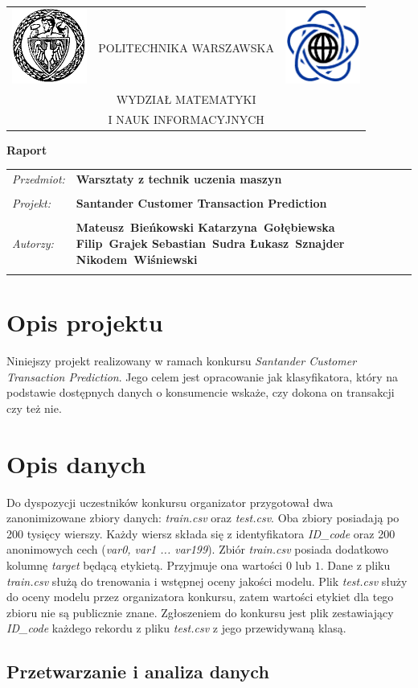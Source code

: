 \documentclass[12pt]{article}
\renewcommand{\maketitle}{
\begin{titlepage}
\begin{table}[t]
\centering
\begin{tabular}[t]{lcr}
 \includegraphics[width=70pt,height=70pt]{PW} & POLITECHNIKA WARSZAWSKA & \includegraphics[width=70pt,height=70pt]{MiNI}\\
& WYDZIAŁ MATEMATYKI & \\
& I NAUK INFORMACYJNYCH &
\end{tabular}
\end{table}
\vspace*{3cm}
  \begin{center}
    \LARGE
    \textbf {Raport}\\
   \vspace*{2 cm}
\begin{table}[!htp]
\begin{tabular}{p{4cm}p{10cm}}
\textit{Przedmiot:} &\textbf {Warsztaty z technik uczenia maszyn} \\
\\
\textit{Projekt:} &\textbf {Santander Customer Transaction Prediction} \\
\\
\textit{Autorzy:} &\textbf {Mateusz~Bieńkowski \newline
	Katarzyna~Gołębiewska \newline
	Filip~Grajek \newline
	Sebastian~Sudra \newline
	Łukasz~Sznajder \newline
	Nikodem~Wiśniewski \newline 
 } \\
\\
\end{tabular}
\end{table}

\vspace{4 cm}
  \center{\small Warszawa, dnia \today}
\end{center}
\end{titlepage}
}
\begin{document}
\maketitle

\newpage

\section{Opis projektu}

Niniejszy projekt realizowany w ramach konkursu \textit{Santander Customer Transaction Prediction}\cite{santanderkaggle}. Jego celem jest opracowanie jak klasyfikatora, który na podstawie dostępnych danych o konsumencie wskaże, czy dokona on transakcji czy też nie. 

\section{Opis danych}

Do dyspozycji uczestników konkursu organizator przygotował dwa zanonimizowane zbiory danych: \textit{train.csv} oraz \textit{test.csv}. Oba zbiory posiadają po 200 tysięcy wierszy. Każdy wiersz składa się z identyfikatora \textit{ID\_code} oraz 200 anonimowych cech (\textit{var0, var1 ... var199}). Zbiór \textit{train.csv} posiada dodatkowo kolumnę \textit{target} będącą etykietą. Przyjmuje ona wartości $0$ lub $1$. Dane z pliku \textit{train.csv} służą do trenowania i wstępnej oceny jakości modelu. Plik \textit{test.csv} służy do oceny modelu przez organizatora konkursu, zatem wartości etykiet dla tego zbioru nie są publicznie znane. Zgłoszeniem do konkursu jest plik zestawiający \textit{ID\_code} każdego rekordu z pliku \textit{test.csv} z jego przewidywaną klasą.


\subsection{Przetwarzanie i analiza danych}
\end{document}
